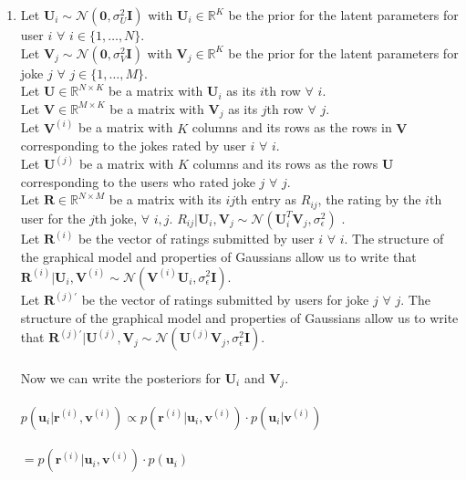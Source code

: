 \documentclass[submit]{harvardml}
\newcommand{\R}{\mathbb{R}}
\newcommand{\N}{\mathcal{N}}
\theoremstyle{plain}
\begin{document}
\begin{enumerate}[label=3.\arabic*.]
\item Let $\mathbf{U}_i\sim\N(\mathbf{0},\sigma^2_U\mathbf{I})$ with $\mathbf{U}_i\in\R^K$ be the prior for the latent parameters for user $i$ $\forall$ $i\in\{1,\ldots,N\}$.\\
Let $\mathbf{V}_j\sim\N(\mathbf{0},\sigma^2_V\mathbf{I})$ with $\mathbf{V}_j\in\R^K$ be the prior for the latent parameters for joke $j$ $\forall$ $j\in\{1,\ldots,M\}$.\\
Let $\mathbf{U}\in\R^{N\times K}$ be a matrix with $\mathbf{U}_i$ as its $i$th row $\forall$ $i$.\\
Let $\mathbf{V}\in\R^{M\times K}$ be a matrix with $\mathbf{V}_j$ as its $j$th row $\forall$ $j$.\\
Let $\mathbf{V}^{(i)}$ be a matrix with $K$ columns and its rows as the rows in $\mathbf{V}$ corresponding to the jokes rated by user $i$ $\forall$ $i$.\\
Let $\mathbf{U}^{(j)}$ be a matrix with $K$ columns and its rows as the rows $\mathbf{U}$ corresponding to the users who rated joke $j$ $\forall$ $j$.\\
Let $\mathbf{R}\in\R^{N\times M}$ be a matrix with its $ij$th entry as $R_{ij}$, the rating by the $i$th user for the $j$th joke, $\forall$ $i,j$. $R_{ij}|\mathbf{U}_i,\mathbf{V}_j\sim\N(\mathbf{U}_i^T\mathbf{V}_j,\sigma_{\epsilon}^2)$ .\\
Let $\mathbf{R}^{(i)}$ be the vector of ratings submitted by user $i$ $\forall$ $i$. The structure of the graphical model and properties of Gaussians allow us to write that $\mathbf{R}^{(i)}|\mathbf{U}_i,\mathbf{V}^{(i)}\sim\N(\mathbf{V}^{(i)}\mathbf{U}_i,\sigma_{\epsilon}^2\mathbf{I})$.\\
Let $\mathbf{R}^{(j)'}$ be the vector of ratings submitted by users for joke $j$ $\forall$ $j$. The structure of the graphical model and properties of Gaussians allow us to write that $\mathbf{R}^{(j)'}|\mathbf{U}^{(j)},\mathbf{V}_j\sim\N(\mathbf{U}^{(j)}\mathbf{V}_j,\sigma_{\epsilon}^2\mathbf{I})$.\\\\
Now we can write the posteriors for $\mathbf{U}_i$ and $\mathbf{V}_j$.\\\\
$p(\mathbf{u}_i|\mathbf{r}^{(i)},\mathbf{v}^{(i)})\propto p(\mathbf{r}^{(i)}|\mathbf{u}_{i},\mathbf{v}^{(i)})\cdot p(\mathbf{u}_{i}|\mathbf{v}^{(i)})$\\\\
$=p(\mathbf{r}^{(i)}|\mathbf{u}_{i},\mathbf{v}^{(i)})\cdot p(\mathbf{u}_{i})$\\\\

\end{enumerate}
\end{document}
